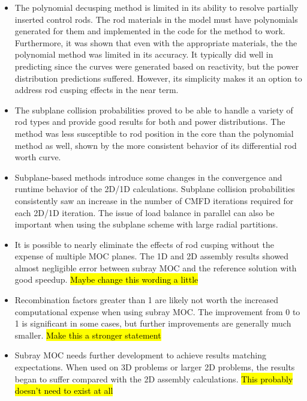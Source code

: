 \begin{itemize}
    \item The polynomial decusping method is limited in its ability to resolve partially inserted control rods.  The rod materials in the model must have polynomials generated for them and implemented in the code for the method to work.  Furthermore, it was shown that even with the appropriate materials, the the polynomial method was limited in its accuracy.  It typically did well in predicting \keff{} since the curves were generated based on reactivity, but the power distribution predictions suffered.  However, its simplicity makes it an option to address rod cusping effects in the near term.
    
    \item The subplane collision probabilities proved to be able to handle a variety of rod types and provide good results for both \keff{} and power distributions.  The method was less susceptible to rod position in the core than the polynomial method as well, shown by the more consistent behavior of its differential rod worth curve.
    
    \item Subplane-based methods introduce some changes in the convergence and runtime behavior of the 2D/1D calculations.  Subplane collision probabilities consistently saw an increase in the number of CMFD iterations required for each 2D/1D iteration.  The issue of load balance in parallel can also be important when using the subplane scheme with large radial partitions.
    
    \item It is possible to nearly eliminate the effects of rod cusping without the expense of multiple MOC planes.  The 1D and 2D assembly results showed almost negligible error between subray MOC and the reference solution with good speedup. \hl{Maybe change this wording a little}
    
    \item Recombination factors greater than 1 are likely not worth the increased computational expense when using subray MOC.  The improvement from 0 to 1 is significant in some cases, but further improvements are generally much smaller. \hl{Make this a stronger statement}
    
    \item Subray MOC needs further development to achieve results matching expectations.  When used on 3D problems or larger 2D problems, the results began to suffer compared with the 2D assembly calculations. \hl{This probably doesn't need to exist at all}
\end{itemize}

